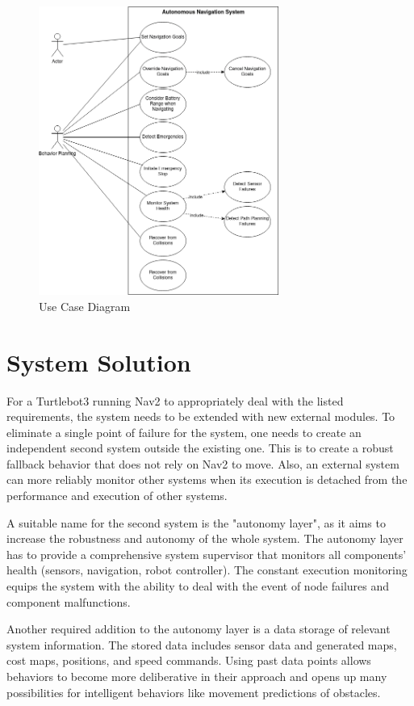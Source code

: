 \begin{figure}[ht]
	\centering
	\includegraphics[width=0.7\textwidth]{images/use_case.png}
	\caption{Use Case Diagram}
	\label{fig:use_case}
\end{figure}


\section{System Solution}

For a Turtlebot3 running Nav2 to appropriately deal with the listed requirements, the system needs to be extended with new external modules. To eliminate a single point of failure for the system, one needs to create an independent second system outside the existing one. This is to create a robust fallback behavior that does not rely on Nav2 to move. Also, an external system can more reliably monitor other systems when its execution is detached from the performance and execution of other systems.

A suitable name for the second system is the "autonomy layer", as it aims to increase the robustness and autonomy of the whole system. The autonomy layer has to provide a comprehensive system supervisor that monitors all components' health (sensors, navigation, robot controller). The constant execution monitoring equips the system with the ability to deal with the event of node failures and component malfunctions.

Another required addition to the autonomy layer is a data storage of relevant system information. The stored data includes sensor data and generated maps, cost maps, positions, and speed commands. Using past data points allows behaviors to become more deliberative in their approach and opens up many possibilities for intelligent behaviors like movement predictions of obstacles. 

